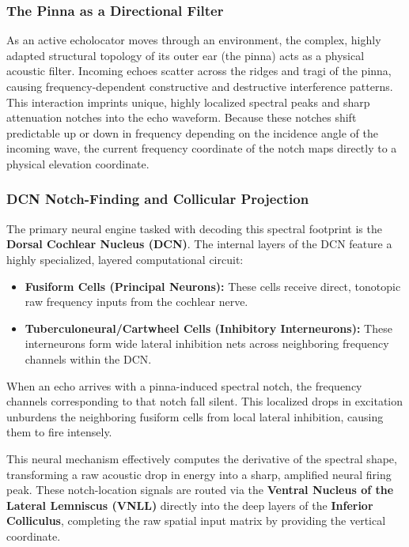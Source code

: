 \subsubsection{The Pinna as a Directional Filter}
As an active echolocator moves through an environment, the complex, highly adapted structural topology of its outer ear (the pinna) acts as a physical acoustic filter. Incoming echoes scatter across the ridges and tragi of the pinna, causing frequency-dependent constructive and destructive interference patterns. This interaction imprints unique, highly localized spectral peaks and sharp attenuation notches into the echo waveform. Because these notches shift predictable up or down in frequency depending on the incidence angle of the incoming wave, the current frequency coordinate of the notch maps directly to a physical elevation coordinate.

\subsubsection{DCN Notch-Finding and Collicular Projection}
The primary neural engine tasked with decoding this spectral footprint is the \textbf{Dorsal Cochlear Nucleus (DCN)}. The internal layers of the DCN feature a highly specialized, layered computational circuit:
\begin{itemize}
    \item \textbf{Fusiform Cells (Principal Neurons):} These cells receive direct, tonotopic raw frequency inputs from the cochlear nerve.
    \item \textbf{Tuberculoneural/Cartwheel Cells (Inhibitory Interneurons):} These interneurons form wide lateral inhibition nets across neighboring frequency channels within the DCN.
\end{itemize}

When an echo arrives with a pinna-induced spectral notch, the frequency channels corresponding to that notch fall silent. This localized drops in excitation unburdens the neighboring fusiform cells from local lateral inhibition, causing them to fire intensely. 

This neural mechanism effectively computes the derivative of the spectral shape, transforming a raw acoustic drop in energy into a sharp, amplified neural firing peak. These notch-location signals are routed via the \textbf{Ventral Nucleus of the Lateral Lemniscus (VNLL)} directly into the deep layers of the \textbf{Inferior Colliculus}, completing the raw spatial input matrix by providing the vertical coordinate.










